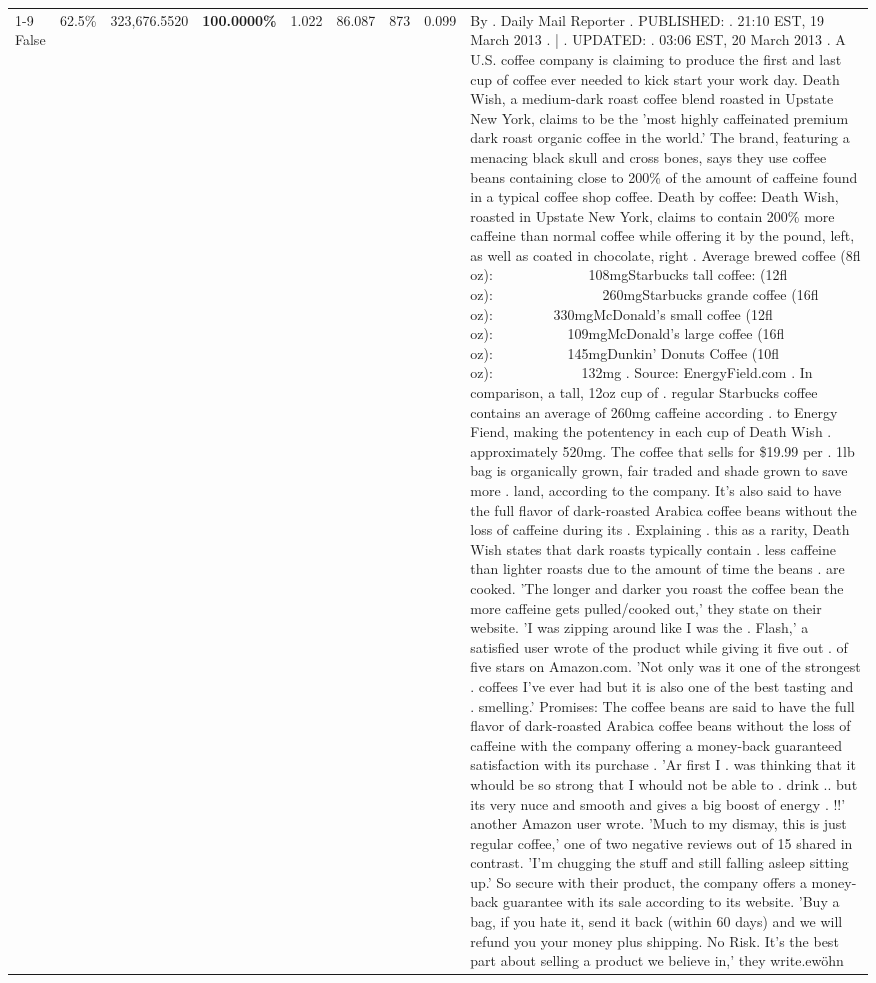 \begin{table}[H]
{\begin{tabular}{lllrlllll}
\cline{1-9} \cline{2-9}
False & 62.5\% & 323,676.5520 & \bfseries \color{red} 100.0000\% & 1.022 & 86.087 & 873 & 0.099 & By . Daily Mail Reporter . PUBLISHED: . 21:10 EST, 19 March 2013 . | . UPDATED: . 03:06 EST, 20 March 2013 . A U.S. coffee company is claiming to produce the first and last cup of coffee ever needed to kick start your work day. Death Wish, a medium-dark roast coffee blend roasted in Upstate New York, claims to be the 'most highly caffeinated premium dark roast organic coffee in the world.' The brand, featuring a menacing black skull and cross bones, says they use coffee beans containing close to 200\% of the amount of caffeine found in a typical coffee shop coffee. Death by coffee: Death Wish, roasted in Upstate New York, claims to contain 200\% more caffeine than normal coffee while offering it by the pound, left, as well as coated in chocolate, right . Average brewed coffee (8fl oz):              108mgStarbucks tall coffee: (12fl oz):                260mgStarbucks grande coffee (16fl oz):         330mgMcDonald's small coffee (12fl oz):           109mgMcDonald's large coffee (16fl oz):           145mgDunkin' Donuts Coffee (10fl oz):             132mg . Source: EnergyField.com . In comparison, a tall, 12oz cup of . regular Starbucks coffee contains an average of 260mg caffeine according . to Energy Fiend, making the potentency in each cup of Death Wish . approximately 520mg. The coffee that sells for \$19.99 per . 1lb bag is organically grown, fair traded and shade grown to save more . land, according to the company. It's also said to have the full flavor of dark-roasted Arabica coffee beans without the loss of caffeine during its . Explaining . this as a rarity, Death Wish states that dark roasts typically contain . less caffeine than lighter roasts due to the amount of time the beans . are cooked. 'The longer and darker you roast the coffee bean the more caffeine gets pulled/cooked out,' they state on their website. 'I was zipping around like I was the . Flash,' a satisfied user wrote of the product while giving it five out . of five stars on Amazon.com. 'Not only was it one of the strongest . coffees I've ever had but it is also one of the best tasting and . smelling.’ Promises: The coffee beans are said to have the full flavor of dark-roasted Arabica coffee beans without the loss of caffeine with the company offering a money-back guaranteed satisfaction with its purchase . 'Ar first I . was thinking that it whould be so strong that I whould not be able to . drink .. but its very nuce and smooth and gives a big boost of energy . !!' another Amazon user wrote. 'Much to my dismay, this is just regular coffee,' one of two negative reviews out of 15 shared in contrast. 'I'm chugging the stuff and still falling asleep sitting up.' So secure with their product, the company offers a money-back guarantee with its sale according to its website. 'Buy a bag, if you hate it, send it back (within 60 days) and we will refund you your money plus shipping. No Risk. It’s the best part about selling a product we believe in,' they write.ewöhn \\

\end{tabular}}
\end{table}
